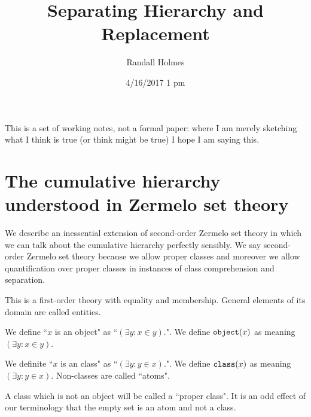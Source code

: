 \documentclass[12pt]{article}
\title{Separating Hierarchy and Replacement}
\author{Randall Holmes}
\date{4/16/2017 1 pm}
\begin{document}
\maketitle

This is a set of working notes, not a formal paper:  where I am merely sketching what I think is true (or think might be true) I hope I am saying this.

\section{The cumulative hierarchy understood in Zermelo set theory}

We describe an inessential extension of second-order Zermelo set theory in which we can talk about the cumulative hierarchy perfectly sensibly.  We say second-order Zermelo set theory because we allow proper classes and moreover we allow quantification over proper classes in instances of class comprehension and separation.

This is a first-order theory with equality and membership.  General elements of its domain are called entities.

We define ``$x$ is an object" as ``$(\exists y:x \in y)$.".  We define ${\tt object}(x)$ as meaning $(\exists y:x \in y)$.

We definite ``$x$ is an class" as ``$(\exists y:y \in x)$.".  We define ${\tt class}(x)$ as meaning $(\exists y:y \in x)$.  Non-classes are called ``atoms".

A class which is not an object will be called a ``proper class".  It is an odd effect of our terminology that the empty set is an atom and not a class.
\end{document}

